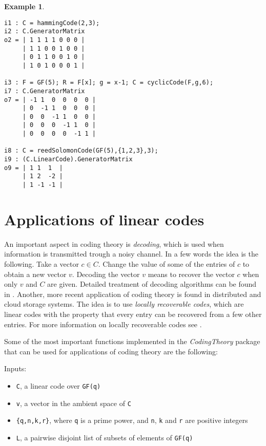 \documentclass[12pt]{amsart}
\theoremstyle{plain}
\newtheorem{example}[theorem]{Example}
\begin{document}
\medskip

\begin{example}
$\,$
\begin{verbatim}
i1 : C = hammingCode(2,3);
i2 : C.GeneratorMatrix
o2 = | 1 1 1 1 0 0 0 |
     | 1 1 0 0 1 0 0 |
     | 0 1 1 0 0 1 0 |
     | 1 0 1 0 0 0 1 |

i3 : F = GF(5); R = F[x]; g = x-1; C = cyclicCode(F,g,6); 
i7 : C.GeneratorMatrix
o7 = | -1 1  0  0  0  0 |
     | 0  -1 1  0  0  0 |
     | 0  0  -1 1  0  0 |
     | 0  0  0  -1 1  0 |
     | 0  0  0  0  -1 1 |

i8 : C = reedSolomonCode(GF(5),{1,2,3},3);
i9 : (C.LinearCode).GeneratorMatrix
o9 = | 1 1  1  |
     | 1 2  -2 |
     | 1 -1 -1 |
\end{verbatim}
\end{example}
\section{Applications of linear codes}
An important aspect in coding theory is {\it decoding}, which is used when information is transmitted trough a noisy channel. In a few words the idea is the following. Take a vector $c\in C.$ Change the value of some of the entries of $c$ to obtain a new vector $v$. Decoding the vector $v$ means to recover the vector $c$ when only $v$ and $C$ are given. Detailed treatment of decoding algorithms can be found in \cite{huf-pless}. Another, more recent application of coding theory is found in distributed and cloud storage systems. The idea is to use {\it locally recoverable codes}, which are linear codes with the property that every entry can be recovered from a few other entries. For more information on locally recoverable codes see \cite{TamoBarg}. 


Some of the most important functions implemented in the {\it CodingTheory} package that can be used for applications of coding theory are the following:

\medskip

Inputs:

\medskip

\begin{itemize}
 \item {\tt C}, a linear code over {\tt GF(q)}
 \item {\tt v}, a vector in the ambient space of {\tt C}
 \item {\tt \{q,n,k,r\}}, where {\tt q} is a prime power, and {\tt n}, {\tt k} and
      {\tt r} are positive integers
 \item {\tt L}, a pairwise disjoint list of subsets of elements of {\tt GF(q)}
\end{itemize}
\end{document}
